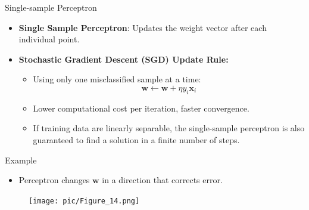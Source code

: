 \documentclass[serif, aspectratio=169]{beamer}
\begin{document}
    \begin{frame}{Single-sample Perceptron}
        \begin{itemize}\itemsep1.5em
        \item \justifying \textbf{Single Sample Perceptron}: Updates the weight vector after each individual point.
        \item \textbf{Stochastic Gradient Descent (SGD) Update Rule:}
        \smallskip
        \begin{itemize}\itemsep1em
        \item Using only one misclassified sample at a time:
        \[
            \mathbf{w} \leftarrow \mathbf{w} + \eta y_i \mathbf{x}_i
        \]
        \item Lower computational cost per iteration, faster convergence.
        \item \justifying If training data are linearly separable, the single-sample perceptron is also guaranteed to find a solution in a finite number of steps.
        \end{itemize}
        \end{itemize}
    \end{frame}

    \begin{frame}{Example}
        \begin{itemize}
            \item Perceptron changes \(\mathbf{w}\) in a direction that corrects error.
        \end{itemize}
        \begin{figure}
            \centering
            \texttt{[image: pic/Figure\_14.png]}
        \end{figure}
        \vfill
    \end{frame}
\end{document}
